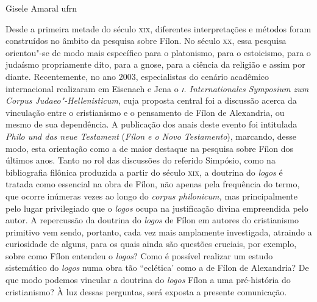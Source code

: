 %
	{Gisele Amaral}%
	{ufrn}


Desde a primeira metade do século \textsc{xix}, diferentes interpretações
e métodos foram construídos no âmbito da pesquisa sobre Fílon. No
século \textsc{xx}, essa pesquisa orientou"-se de modo mais específico
para o platonismo, para o estoicismo, para o judaísmo
propriamente dito, para a gnose, para a ciência da religião e
assim por diante. Recentemente, no ano 2003, especialistas do
cenário acadêmico internacional realizaram em Eisenach e Jena o
\emph{\textsc{i}. Internationales Symposium zum Corpus
Judaeo"-Hellenisticum}, cuja proposta central foi a discussão
acerca da vinculação entre o cristianismo e o pensamento de Fílon
de Alexandria, ou mesmo de sua dependência. A publicação dos
anais deste evento foi intitulada \emph{Philo und das neue
Testament} (\emph{Fílon e o Novo Testamento}), marcando, desse
modo, esta orientação como a de maior destaque na pesquisa sobre
Fílon dos últimos anos. Tanto no rol das discussões do referido
Simpósio, como na bibliografia filônica produzida a partir do
século \textsc{xix}, a doutrina do \emph{logos} é tratada como
essencial na obra de Fílon, não apenas pela frequência do termo,
que ocorre inúmeras vezes ao longo do \emph{corpus
philonicum,} mas principalmente pelo lugar privilegiado que o
\emph{logos} ocupa na justificação divina empreendida pelo
autor. A repercussão da doutrina do \emph{logos} de Fílon em
autores do cristianismo primitivo vem sendo, portanto, cada vez
mais amplamente investigada, atraindo a curiosidade de alguns,
para os quais ainda são questões cruciais, por exemplo, sobre
como Fílon entendeu o \emph{logos}? Como é possível realizar um
estudo sistemático do \emph{logos} numa obra tão ``eclética'
como a de Fílon de Alexandria? De que modo podemos vincular a
doutrina do \emph{logos} Fílon a uma pré-história do
cristianismo? À luz dessas perguntas, será exposta a presente
comunicação.

